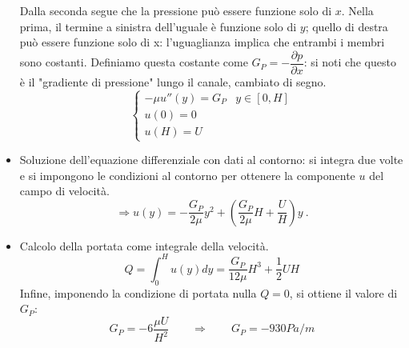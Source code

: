 \begin{itemize}
Dalla seconda segue che la pressione può essere funzione solo di $x$. Nella prima, il termine a sinistra dell'uguale è funzione solo di $y$; quello di destra
può essere funzione solo di x: l'uguaglianza implica che entrambi i membri sono 
costanti. Definiamo questa costante come $ G_P = - \dfrac{\partial p}{\partial x} $: si noti che questo è il "gradiente di pressione" lungo il canale, cambiato di segno.
%  
  \begin{equation}
  \begin{cases}
    - \mu u''(y) = G_P & y \in[0,H] \\
    u(0) = 0  \\ u(H) = U
  \end{cases}
  \end{equation}
  
  
  
  \item Soluzione dell'equazione differenziale  con dati al contorno: si integra due volte e si impongono le condizioni al contorno per ottenere la componente $u$ del campo di velocità.
  \begin{equation}
    \Rightarrow u(y) = -\dfrac{G_P}{2 \mu} y^2 + \left( \dfrac{G_P}{2 \mu}H
    + \dfrac{U}{H} \right) y \ .
  \end{equation}
  
  \item Calcolo della portata come integrale della velocità. 
  \begin{equation}
    Q = \int_{0}^{H} u(y) dy = \dfrac{G_P}{12 \mu} H^3 + \dfrac{1}{2} U H
  \end{equation}
  Infine, imponendo la condizione di portata nulla $Q=0$, si ottiene il valore di $G_P$:
  \begin{equation}
    G_P = -6\dfrac{\mu U}{H^2} \qquad \Rightarrow \qquad G_P = - 930 Pa/m
  \end{equation}
  
\end{itemize}
